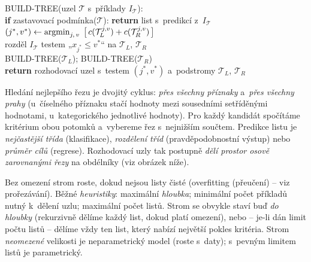 \begin{algo}
\ttfamily\small
BUILD-TREE(uzel $\mathcal{T}$ s~příklady $I_{\mathcal{T}}$):\\
\hspace*{1.5em}\textbf{if} zastavovací podmínka($\mathcal{T}$): \textbf{return} list s~predikcí z~$I_{\mathcal{T}}$ \\
\hspace*{1.5em}$(j^{*}, v^{*}) \leftarrow \operatorname*{argmin}_{j,\,v}\;\big[\,c(\mathcal{T}_L^{j,v}) + c(\mathcal{T}_R^{j,v})\,\big]$ \\
\hspace*{1.5em}rozděl $I_{\mathcal{T}}$ testem „$x_{j^{*}} \le v^{*}$`` na $\mathcal{T}_L$, $\mathcal{T}_R$\\
\hspace*{1.5em}BUILD-TREE($\mathcal{T}_L$); BUILD-TREE($\mathcal{T}_R$)\\
\hspace*{1.5em}\textbf{return} rozhodovací uzel s~testem $(j^{*}, v^{*})$ a~podstromy $\mathcal{T}_L$, $\mathcal{T}_R$
\end{algo}

\begin{intuice}
Hledání nejlepšího řezu je dvojitý cyklus: \emph{přes všechny příznaky} a~\emph{přes všechny prahy} (u~číselného příznaku stačí hodnoty mezi sousedními setříděnými hodnotami, u~kategorického jednotlivé hodnoty). Pro každý kandidát spočítáme kritérium obou potomků a~vybereme řez s~nejnižším součtem. Predikce listu je \emph{nejčastější třída} (klasifikace), \emph{rozdělení tříd} (pravděpodobnostní výstup) nebo \emph{průměr cílů} (regrese). Rozhodovací uzly tak postupně \emph{dělí prostor osově zarovnanými řezy} na obdélníky (viz obrázek níže).
\end{intuice}

\begin{poznamka}
Bez omezení strom roste, dokud nejsou listy čisté (overfitting (přeučení) -- viz prořezávání). Běžné \emph{heuristiky}: maximální \emph{hloubka}; minimální počet příkladů nutný k~dělení uzlu; maximální počet listů. Strom se obvykle staví buď \emph{do hloubky} (rekurzivně dělíme každý list, dokud platí omezení), nebo -- je-li dán limit počtu listů -- dělíme vždy ten list, který nabízí největší pokles kritéria. Strom \emph{neomezené} velikosti je neparametrický model (roste s~daty); s~pevným limitem listů je parametrický.
\end{poznamka}

